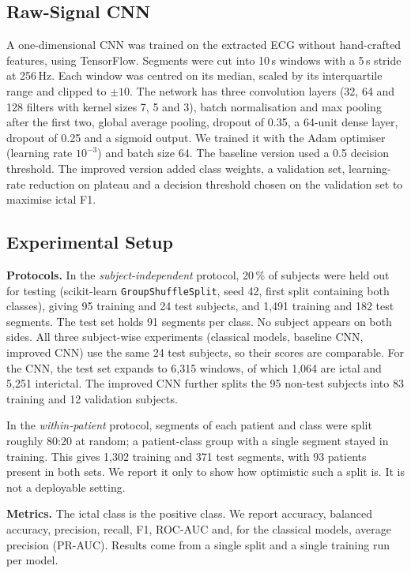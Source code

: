 \documentclass[conference,a4paper]{IEEEtran}
\begin{document}
\subsection{Raw-Signal CNN}
A one-dimensional CNN was trained on the extracted ECG without hand-crafted
features, using TensorFlow. Segments were cut into 10\,s windows with a 5\,s
stride at 256\,Hz. Each window was centred on its median, scaled by its
interquartile range and clipped to $\pm10$. The network has three
convolution layers (32, 64 and 128 filters with kernel sizes 7, 5 and 3),
batch normalisation and max pooling after the first two, global average
pooling, dropout of 0.35, a 64-unit dense layer, dropout of 0.25 and a
sigmoid output. We trained it with the Adam optimiser (learning rate
$10^{-3}$) and batch size 64. The baseline version used a 0.5 decision
threshold. The improved version added class weights, a validation set,
learning-rate reduction on plateau and a decision threshold chosen on the
validation set to maximise ictal F1.

\subsection{Experimental Setup}
\textbf{Protocols.} In the \textit{subject-independent} protocol, 20\,\% of
subjects were held out for testing (scikit-learn \texttt{GroupShuffleSplit},
seed 42, first split containing both classes), giving 95 training and 24
test subjects, and 1,491 training and 182 test segments. The test set holds
91 segments per class. No subject appears on both sides. All three
subject-wise experiments (classical models, baseline CNN, improved CNN) use
the same 24 test subjects, so their scores are comparable. For the CNN, the
test set expands to 6,315 windows, of which 1,064 are ictal and 5,251
interictal. The improved CNN further splits the 95 non-test subjects into 83
training and 12 validation subjects.

In the \textit{within-patient} protocol, segments of each patient and class
were split roughly 80:20 at random; a patient-class group with a single
segment stayed in training. This gives 1,302 training and 371 test segments,
with 93 patients present in both sets. We report it only to show how
optimistic such a split is. It is not a deployable setting.

\textbf{Metrics.} The ictal class is the positive class. We report accuracy,
balanced accuracy, precision, recall, F1, ROC-AUC and, for the classical
models, average precision (PR-AUC). Results come from a single split and a
single training run per model.
\end{document}
